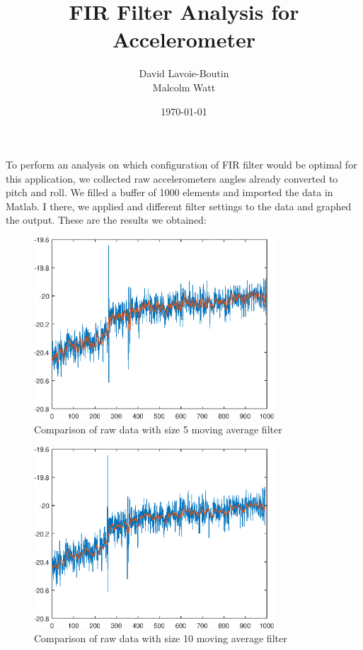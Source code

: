 \documentclass{article}
\title{FIR Filter Analysis for Accelerometer}
\author{David Lavoie-Boutin\\Malcolm Watt}
\date{\today}
\begin{document}
    \maketitle

    To perform an analysis on which configuration of FIR filter would be optimal for this application, we collected raw accelerometers angles already converted to pitch and roll. We filled a buffer of 1000 elements and imported the data in Matlab. I there, we applied and different filter settings to the data and graphed the output. These are the results we obtained:

    \begin{figure}[!htb]
        \centering
        \includegraphics[width = 0.8\textwidth]{../average_size_5.eps}
        \caption{Comparison of raw data with size 5 moving average filter}
    \end{figure}

    \begin{figure}[!htb]
        \centering
        \includegraphics[width = 0.8\textwidth]{../average_size_10.eps}
        \caption{Comparison of raw data with size 10 moving average filter}
    \end{figure}
\end{document}
